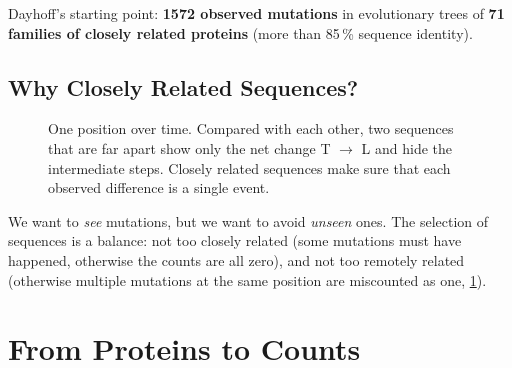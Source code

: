 \documentclass[11pt, oneside]{book}
\newcommand{\T}{^{\mathsf{T}}}           %
\let\originalsection\section
\renewcommand{\section}{\Needspace{7\baselineskip}\originalsection}
\let\originalsubsection\subsection
\renewcommand{\subsection}{\Needspace{6\baselineskip}\originalsubsection}
\begin{document}
Dayhoff's starting point: \textbf{1572 observed mutations} in evolutionary
trees of \textbf{71 families of closely related proteins} (more than 85\,\%
sequence identity).

\subsection{Why Closely Related Sequences?}

\begin{figure}[htbp]
\centering
{}
\caption{One position over time. Compared with each other, two sequences
that are far apart show only the net change T $\to$ L and hide the
intermediate steps. Closely related sequences make sure that each observed
difference is a single event.}
\label{fig:multiple-hits}
\end{figure}

We want to \emph{see} mutations, but we want to avoid \emph{unseen} ones. The
selection of sequences is a balance: not too closely related (some mutations
must have happened, otherwise the counts are all zero), and not too remotely
related (otherwise multiple mutations at the same position are miscounted as
one, \cref{fig:multiple-hits}).

\section{From Proteins to Counts}
\end{document}
